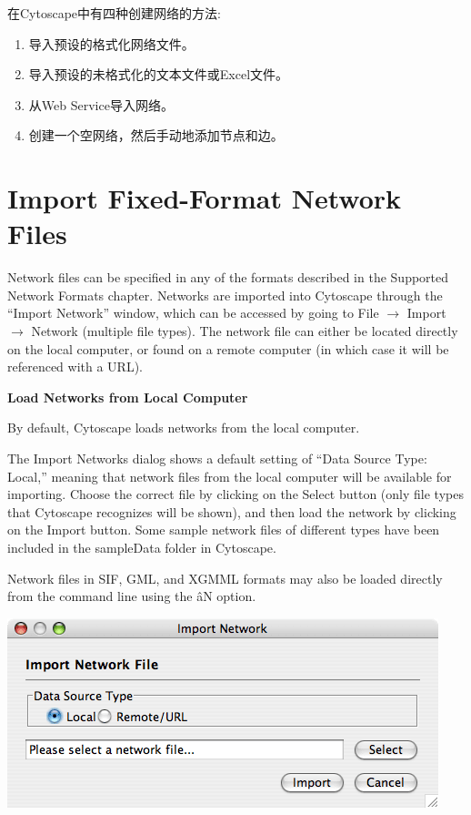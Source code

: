 在Cytoscape中有四种创建网络的方法:
\begin{enumerate}
\item 导入预设的格式化网络文件。
\item 导入预设的未格式化的文本文件或Excel文件。
\item 从Web Service导入网络。
\item 创建一个空网络，然后手动地添加节点和边。
\end{enumerate}
\section{Import Fixed-Format Network Files}

 Network files can be specified in any of the formats described in the Supported Network Formats chapter. Networks are imported into Cytoscape through the ``Import Network'' window, which can be accessed by going to File $\rightarrow$ Import $\rightarrow$ Network (multiple file types). The network file can either be located directly on the local computer, or found on a remote computer (in which case it will be referenced with a URL). 


 \textbf{Load Networks from Local Computer}


 By default, Cytoscape loads networks from the local computer. 


 The Import Networks dialog shows a default setting of ``Data Source Type: Local,'' meaning that network files from the local computer will be available for importing. Choose the correct file by clicking on the Select button (only file types that Cytoscape recognizes will be shown), and then load the network by clicking on the Import button. Some sample network files of different types have been included in the sampleData folder in Cytoscape. 


 Network files in SIF, GML, and XGMML formats may also be loaded directly from the command line using the \^aN option. 


 \includegraphics[wdith=\textwidth]{images/network_import_dialog1_25.png} 


